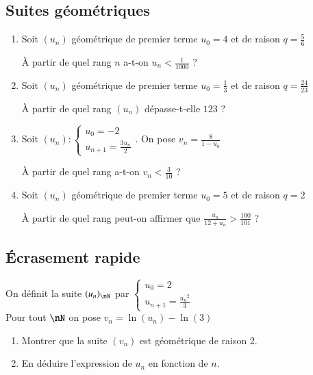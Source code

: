 \documentclass[oneside,12pt]{article}          %
\begin{document}
\subsection{Suites géométriques}
\begin{enumerate}
    \item Soit $(u_n)$ géométrique de premier terme $u_0 = 4$ et de raison $q = \frac{5}{6}$

    À partir de quel rang $n$ a-t-on $u_n < \frac{1}{1000}$ ?

    \item Soit $(u_n)$ géométrique de premier terme $u_0 = \frac{1}{3}$ et de raison $q = \frac{24}{23}$

    À partir de quel rang $(u_n)$ dépasse-t-elle $123$ ?

    \item Soit $(u_n):\begin{cases}u_0=-2\\u_{n+1}=\frac{3u_n}{2}\end{cases}$. On pose $v_n = \frac{8}{1 - u_n}$

    À partir de quel rang a-t-on $v_n < \frac{3}{10}$ ?

    \item Soit $(u_n)$ géométrique de premier terme $u_0 = 5$ et de raison $q = 2$

    À partir de quel rang peut-on affirmer que $\frac{u_n}{12 + u_n} > \frac{100}{101}$ ?
\end{enumerate}



\subsection{Écrasement rapide}
On définit la suite $(u_n)_{\nN}$ par $\begin{cases}u_0=2 \\ u_{n+1}=\frac{{u_n}^2}{3}\end{cases}$ \\
Pour tout $\nN$ on pose $v_n=\ln(u_n)-\ln(3)$
\begin{enumerate}
	\item Montrer que la suite $(v_n)$ est géométrique de raison 2.
	\item En déduire l'expression de $u_n$ en fonction de $n$.
\end{enumerate}
\end{document}

